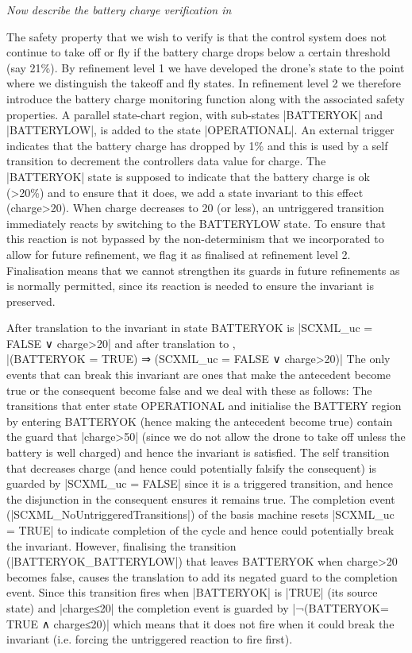\emph{Now describe the battery charge verification in \UMLB}

The safety property that we wish to verify is that the control system does not continue to take off or fly if the battery charge drops below a certain threshold (say 21\%). 
By refinement level 1 we have developed the drone's state to the point where we distinguish the takeoff and fly states.
In refinement level 2 we therefore introduce the battery charge monitoring function along with the associated safety properties.
A parallel state-chart region, with sub-states |BATTERYOK| and |BATTERYLOW|, is added to the state |OPERATIONAL|.
An external trigger indicates that the battery charge has dropped by 1\% and this is used by a self transition to decrement the controllers data value for charge.
The |BATTERYOK| state is supposed to indicate that the battery charge is ok (>20\%) and to ensure that it does, we add a state invariant to this effect (charge>20).
When charge decreases to 20 (or less), an untriggered transition immediately reacts by switching to the BATTERYLOW state.
To ensure that this reaction is not bypassed by the non-determinism that we incorporated to allow for future refinement, we flag it as finalised at refinement level 2.
Finalisation means that we cannot strengthen its guards in future refinements as is normally permitted, since its reaction is needed to ensure the invariant is preserved.

After translation to \UMLB the invariant in state BATTERYOK is |SCXML_uc = FALSE ∨ charge>20| and after translation to \EVENTB, \\
|(BATTERYOK = TRUE) ⇒ (SCXML_uc = FALSE ∨ charge>20)|
The only events that can break this invariant are ones that make the antecedent become true or the consequent become false and we deal with these as follows:
The transitions that enter state OPERATIONAL and initialise the BATTERY region by entering BATTERYOK (hence making the antecedent become true) contain the guard that |charge>50| (since we do not allow the drone to take off unless the battery is well charged) and hence the invariant is satisfied.
The self transition that decreases charge (and hence could potentially falsify the consequent) is guarded by |SCXML_uc = FALSE| since it is a triggered transition, and hence the disjunction in the consequent ensures it remains true.
The completion event (|SCXML_NoUntriggeredTransitions|) of the basis machine resets |SCXML_uc = TRUE| to indicate completion of the cycle and hence could potentially break the invariant. 
However, finalising the transition (|BATTERYOK_BATTERYLOW|) that leaves BATTERYOK when charge>20 becomes false, causes the translation to add its negated guard to the completion event.
Since this transition fires when |BATTERYOK| is |TRUE| (its source state) and |charge≤20| the completion event is guarded by |¬(BATTERYOK= TRUE ∧ charge≤20)| which means that it does not fire when it could break the invariant (i.e. forcing the untriggered reaction to fire first).











